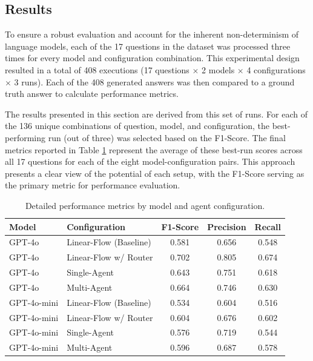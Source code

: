     \subsection{Results}

        To ensure a robust evaluation and account for the inherent non-determinism of language models, each of the 17 questions in the dataset was processed three times for every model and configuration combination. This experimental design resulted in a total of 408 executions (17 questions $\times$ 2 models $\times$ 4 configurations $\times$ 3 runs). Each of the 408 generated answers was then compared to a ground truth answer to calculate performance metrics.

        The results presented in this section are derived from this set of runs. For each of the 136 unique combinations of question, model, and configuration, the best-performing run (out of three) was selected based on the F1-Score. The final metrics reported in Table \ref{tab:performance_metrics} represent the average of these best-run scores across all 17 questions for each of the eight model-configuration pairs. This approach presents a clear view of the potential of each setup, with the F1-Score serving as the primary metric for performance evaluation.

        \begin{table}[h]
            \centering
            \caption{Detailed performance metrics by model and agent configuration.}
            \label{tab:performance_metrics}
            \begin{tabular}{llccc}
                \toprule
                \textbf{Model} & \textbf{Configuration} & \textbf{F1-Score} & \textbf{Precision} & \textbf{Recall} \\
                \midrule
                GPT-4o & Linear-Flow (Baseline) & 0.581 & 0.656 & 0.548 \\
                GPT-4o & Linear-Flow w/ Router & 0.702 & 0.805 & 0.674 \\
                GPT-4o & Single-Agent & 0.643 & 0.751 & 0.618 \\
                GPT-4o & Multi-Agent & 0.664 & 0.746 & 0.630 \\
                \midrule
                GPT-4o-mini & Linear-Flow (Baseline) & 0.534 & 0.604 & 0.516 \\
                GPT-4o-mini & Linear-Flow w/ Router & 0.604 & 0.676 & 0.602 \\
                GPT-4o-mini & Single-Agent & 0.576 & 0.719 & 0.544 \\
                GPT-4o-mini & Multi-Agent & 0.596 & 0.687 & 0.578 \\
                \bottomrule
            \end{tabular}
        \end{table}

